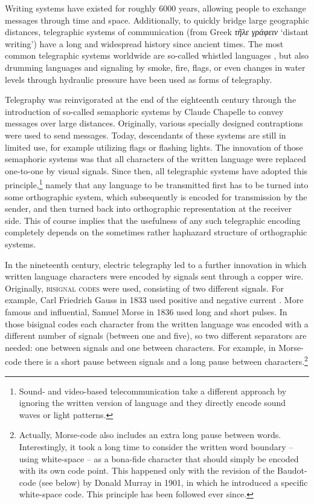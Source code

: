 Writing systems have existed for roughly 6000 years, allowing people to exchange
messages through time and space. Additionally, to quickly bridge large geographic
distances, telegraphic systems of communication (from Greek \emph{τῆλε
γράφειν} `distant writing') have a long and widespread history since ancient
times. The most common telegraphic systems worldwide are so-called whistled
languages \citep{Meyer2015}, but also drumming languages \citep{Meyer2012} and
signaling by smoke, fire, flags, or even changes in water levels through
hydraulic pressure have been used as forms of telegraphy. 

Telegraphy was reinvigorated at the end of the eighteenth century through the
introduction of so-called semaphoric systems by Claude Chapelle to convey
messages over large distances. Originally, various specially designed
contraptions were used to send messages. Today, descendants of these systems are
still in limited use, for example utilizing flags or flashing lights. The
innovation of those semaphoric systems was that all characters of the
written language were replaced one-to-one by visual signals. Since then, all
telegraphic systems have adopted this principle,\footnote{Sound- and
video-based telecommunication take a different approach by ignoring
the written version of language and they directly encode sound waves or light
patterns.} namely that any language to be
transmitted first has to be turned into some orthographic system, which
subsequently is encoded for transmission by the sender, and then turned back
into orthographic representation at the receiver side. This of course implies 
that the usefulness of any such telegraphic
encoding completely depends on the sometimes rather haphazard structure of
orthographic systems.

In the nineteenth century, electric telegraphy led to a further innovation in
which written language characters were encoded by signals sent through a copper
wire. Originally, \textsc{bisignal codes} were used, consisting of two different
signals. For example, Carl Friedrich Gauss in 1833 used positive and negative
current \citep[282]{Mania2008}. More famous and influential, Samuel Morse in
1836 used long and short pulses. In those bisignal codes each character from the
written language was encoded with a different number of signals (between one and
five), so two different separators are needed: one between signals and one
between characters. For example, in Morse-code there is a short pause between
signals and a long pause between characters.\footnote{Actually, Morse-code also
includes an extra long pause between words. Interestingly, it took a long time
to consider the written word boundary -- using white-space -- as a bona-fide
character that should simply be encoded with its own code point. This happened
only with the revision of the Baudot-code (see below) by Donald Murray in 1901,
in which he introduced a specific white-space code. This principle has been
followed ever since.}

